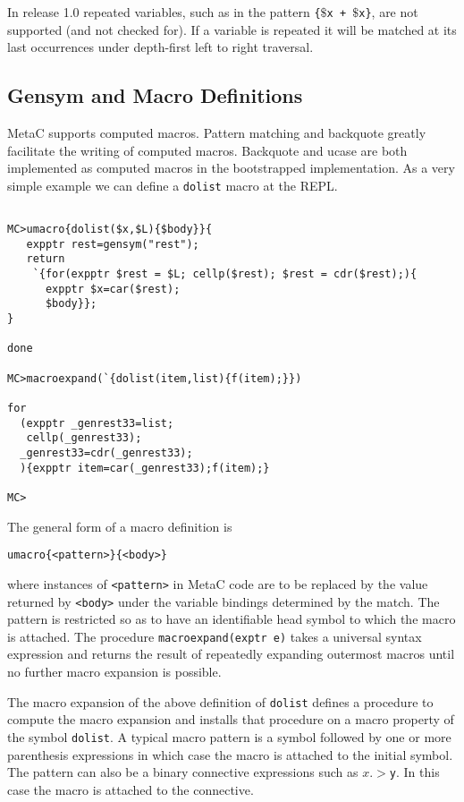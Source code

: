 \documentclass{article}
\begin{document}
In release 1.0 repeated variables, such as in the pattern {\tt \{$\$$x + $\$$x\}}, are not supported (and not checked for).
If a variable is repeated it will be matched at its last occurrences under depth-first left to right traversal.

\subsection{Gensym and Macro Definitions}

MetaC supports computed macros.  Pattern matching and backquote greatly facilitate the writing of computed macros.  Backquote and ucase are both implemented as computed macros in the bootstrapped implementation. As a very simple example we can define a {\tt dolist} macro at the REPL.

\begin{verbatim}

MC>umacro{dolist($x,$L){$body}}{
   expptr rest=gensym("rest");
   return
    `{for(expptr $rest = $L; cellp($rest); $rest = cdr($rest);){
      expptr $x=car($rest);
      $body}};
}

done

MC>macroexpand(`{dolist(item,list){f(item);}})

for
  (expptr _genrest33=list;
   cellp(_genrest33);
  _genrest33=cdr(_genrest33);
  ){expptr item=car(_genrest33);f(item);}

MC>
\end{verbatim}

The general form of a macro definition is
\begin{verbatim}
umacro{<pattern>}{<body>}
\end{verbatim}
where instances of {\tt <pattern>} in MetaC code are to be replaced by
the value returned by {\tt <body>} under the variable bindings
determined by the match.  The pattern is restricted so as to have
an identifiable head symbol to which the macro is attached.
The procedure {\tt macroexpand(exptr e)} takes a
universal syntax expression and returns the result of repeatedly
expanding outermost macros until no further macro expansion is
possible.

The macro expansion of the above definition of {\tt dolist}
defines a procedure
to compute the macro expansion and installs that procedure on a macro
property of the symbol {\tt dolist}.  A typical macro pattern
is a symbol followed by one or more parenthesis
expressions in which case the macro is attached to the initial symbol.
The pattern can also be
a binary connective expressions such as {\tt {$x .> $y}}.  In this case
the macro is attached to the connective.
\end{document}
